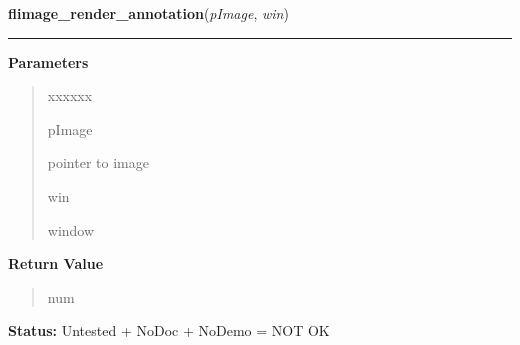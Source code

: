 \hspace{.8\funcindent}\begin{boxedminipage}{\funcwidth}

    \raggedright \textbf{flimage\_render\_annotation}(\textit{pImage}, \textit{win})

    \vspace{-1.5ex}

    \rule{\textwidth}{0.5\fboxrule}
\setlength{\parskip}{2ex}
\setlength{\parskip}{1ex}
      \textbf{Parameters}
      \vspace{-1ex}

      \begin{quote}
        \begin{Ventry}{xxxxxx}

          \item[pImage]

          pointer to image

          \item[win]

          window

        \end{Ventry}

      \end{quote}

      \textbf{Return Value}
    \vspace{-1ex}

      \begin{quote}
      num

      \end{quote}

\textbf{Status:} Untested + NoDoc + NoDemo = NOT OK



    \end{boxedminipage}

    \label{xformslib:library:flimage_error}

    \vspace{0.5ex}

